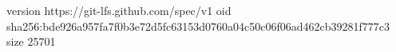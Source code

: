 version https://git-lfs.github.com/spec/v1
oid sha256:bde926a957fa7f0b3e72d5fc63153d0760a04c50c06f06ad462cb39281f777c3
size 25701
